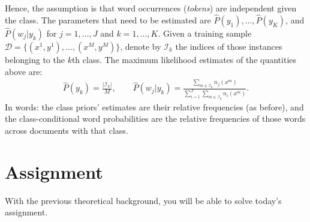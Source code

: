 Hence, the assumption is that word occurrences (\emph{tokens}) are independent given the class. 
The parameters that need to be estimated are ${\hat P}(y_1),\ldots,{\hat P}(y_K)$, and ${\hat P}(w_j|y_k)$ for $j=1,\ldots,J$ and $k=1,\ldots,K$. 
Given a training sample $\mathcal{D} = \{(x^{1},y^{1}),\ldots,(x^{M},y^{M})\}$, 
denote by $\mathcal{I}_k$ the indices of those instances belonging to the $k$th class. 
The maximum likelihood estimates of the quantities above are: 
\begin{eqnarray}\label{eq:mlemultinomial}
{\hat P}(y_k) = \frac{|\mathcal{I}_k|}{M}, \qquad
{\hat P}(w_j|y_k) = \frac{\sum_ {m \in \mathcal{I}_k} n_j(x^m)}{\sum_{i=1}^J \sum_ {m\in \mathcal{I}_k} n_i(x^m)}.
\end{eqnarray}
In words: the class priors' estimates are their relative frequencies (as before), and 
the class-conditional word probabilities are the relative frequencies of those words across documents with that class.


\section{Assignment}

With the previous theoretical background, you will be able to solve today's assignment.  

